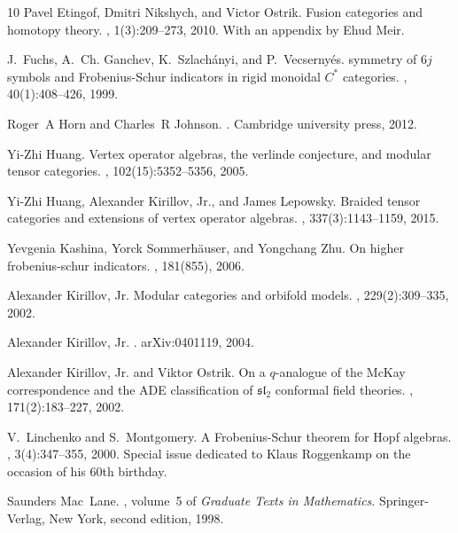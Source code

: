 \documentclass{amsart}
\begin{document}
\begin{thebibliography}{10}
Pavel Etingof, Dmitri Nikshych, and Victor Ostrik.
\newblock Fusion categories and homotopy theory.
, 1(3):209--273, 2010.
\newblock With an appendix by Ehud Meir.

J.~Fuchs, A.~Ch. Ganchev, K.~Szlach{\'a}nyi, and P.~Vecserny{\'e}s.
 symmetry of {$6j$} symbols and {F}robenius-{S}chur indicators
  in rigid monoidal {$C^*$} categories.
, 40(1):408--426, 1999.

Roger~A Horn and Charles~R Johnson.
.
\newblock Cambridge university press, 2012.

Yi-Zhi Huang.
\newblock Vertex operator algebras, the verlinde conjecture, and modular tensor
  categories.
,
  102(15):5352--5356, 2005.

Yi-Zhi Huang, Alexander Kirillov, Jr., and James Lepowsky.
\newblock Braided tensor categories and extensions of vertex operator algebras.
, 337(3):1143--1159, 2015.

Yevgenia Kashina, Yorck Sommerh\"{a}user, and Yongchang Zhu.
\newblock On higher frobenius-schur indicators.
, 181(855), 2006.

Alexander Kirillov, Jr.
\newblock Modular categories and orbifold models.
, 229(2):309--335, 2002.

Alexander {Kirillov}, Jr.
.
\newblock arXiv:0401119, 2004.

Alexander Kirillov, Jr. and Viktor Ostrik.
\newblock On a {$q$}-analogue of the {M}c{K}ay correspondence and the {ADE}
  classification of {$\mathfrak{sl}_2$} conformal field theories.
, 171(2):183--227, 2002.

V.~Linchenko and S.~Montgomery.
\newblock A {F}robenius-{S}chur theorem for {H}opf algebras.
, 3(4):347--355, 2000.
\newblock Special issue dedicated to Klaus Roggenkamp on the occasion of his
  60th birthday.

Saunders Mac~Lane.
, volume~5 of {\em
  Graduate Texts in Mathematics}.
\newblock Springer-Verlag, New York, second edition, 1998.


\end{thebibliography}
\end{document}
